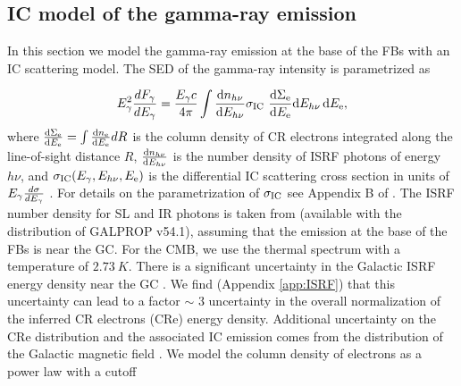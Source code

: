 \subsection{IC model of the gamma-ray emission}
\label{sec:IC_model}

In this section we model the gamma-ray emission at the base of the FBs with an IC scattering model.
The SED of the gamma-ray intensity is parametrized as

\begin{equation}
E^2_\g \frac{dF_\g}{dE_\g} = 
\frac{E_\g c}{4\pi}\int \frac{\de n_{h\nu}}{\de E_{h\nu}} \sigma_\IC\ \frac{\de \Sigma_{\el}}{\de E_{\el}} \de E_{h\nu}\, \de E_\el,
\end{equation}
where $\frac{\text{d} \Sigma_{\text{e}}}{\text{d} E_{\text{e}}} = \int \frac{\text{d} n_{\text{e}}}{\text{d} E_{\text{e}}} dR$ is the column density 
of CR electrons integrated along the line-of-sight distance $R$,
$\frac{\text{d} n_{h\nu}}{\text{d} E_{h\nu}}$ is the number density of ISRF photons of energy $h\nu$,
and $\sigma_{\text{IC}}(E_\gamma, E_{h\nu}, E_{\text{e}})$
is the differential IC scattering cross section in units of $E_\gamma\frac{d\sigma}{d E_\gamma}$ \citep{1970RvMP...42..237B}.
For details on the parametrization of $\sigma_{\text{IC}}$ see Appendix B of \cite{2014ApJ...793...64A}.
The ISRF number density for SL and IR photons is taken from 
\cite{Porter:2008ve} (available with the distribution of GALPROP v54.1),
assuming that the emission at the base of the FBs is near the GC.
For the CMB, we use the thermal spectrum with a temperature of $\SI{2.73}{K}$.
There is a significant uncertainty in the Galactic ISRF energy density near the GC \citep[e.g.,][]{2017MNRAS.470.2539P, 2017ApJ...846...67P, 2019APh...107....1N}.
We find (Appendix \ref{app:ISRF}) that this uncertainty can lead to a factor $\sim$ 3 uncertainty in the overall
normalization of the inferred CR electrons (CRe) energy density.
Additional uncertainty on the CRe distribution and the associated IC emission comes from the distribution of the Galactic magnetic field
\citep[e.g.,][]{2018MNRAS.475.2724O, 2019arXiv190108604O}.
We model the column density of electrons as a power law with a cutoff

